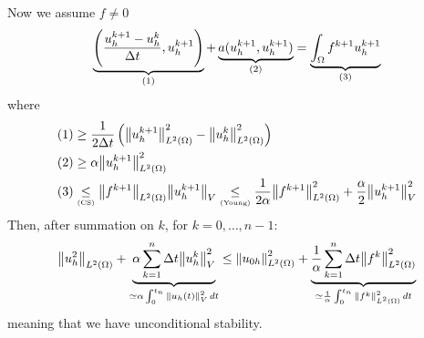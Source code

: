 Now we assume \(f \neq 0\) 
\[
    \underbrace{\left( \frac{u_h^{k+1} - u_h^{k}}{\Delta t}, u_h^{k+1} \right)}_{(1)} + \underbrace{a(u_h^{k+1},u_h^{k+1})}_{(2)} = \underbrace{\int_\Omega f^{k+1}u_h^{k+1}}_{(3)}
\]
where 
\begin{align*}
    (1) &\geq \frac{1}{2\Delta t } \left( \norm{u_h^{k+1}}_{L^2(\Omega)}^2 -\norm{u_h^{k}}_{L^2(\Omega)}^2 \right) \\
    (2) &\geq \alpha \norm{u_h^{k+1}}_{L^2(\Omega)}^2 \\
    (3) &\underset{\text{\tiny{(CS)}}}{\leq} \norm{f^{k+1}}_{L^2(\Omega)} \norm{u_h^{k+1}}_V \underset{\text{\tiny{(Young)}}}{\leq} \frac{1}{2\alpha} \norm{f^{k+1}}_{L^2(\Omega)}^2 + \frac{\alpha}{2} \norm{u_h^{k+1}}_V^2
\end{align*}
Then, after summation on \(k\), for \(k = 0,\ldots, n-1\):
\begin{equation*}
    \norm{u_h^2}_{L^2(\Omega)} + \underbrace{\alpha \sum_{k=1}^{n}\Delta t \norm{u_h^{k}}_V^2}_{\simeq \alpha \int_0^{t_n} \norm{u_h(t)}_V^2 \, dt} \leq \norm{u_{0h}}_{L^2(\Omega)}^2 + \underbrace{\frac{1}{\alpha} \sum_{k=1}^{n} \Delta t \norm{f^k}_{L^2(\Omega)}^2}_{\simeq\frac{1}{\alpha} \int_0^{t_n} \norm{f^k}_{L^2(\Omega)}^2 \, dt}
\end{equation*}
meaning that we have unconditional stability. 

